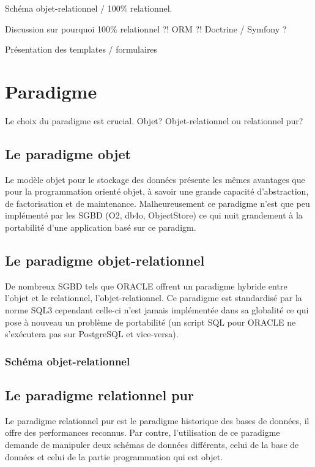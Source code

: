 Schéma objet-relationnel / 100\% relationnel.

Discussion sur pourquoi 100\% relationnel ?! ORM ?! Doctrine / Symfony ?

Présentation des templates / formulaires

\section{Paradigme}
Le choix du paradigme est crucial. Objet? Objet-relationnel ou relationnel pur?

\subsection{Le paradigme objet}

Le modèle objet pour le stockage des données présente les mêmes avantages que pour la programmation orienté objet, à savoir
une grande capacité d'abstraction, de factorisation et de maintenance. Malheureusement ce paradigme n'est que peu implémenté 
par les SGBD (O2, db4o, ObjectStore) ce qui nuit grandement à la portabilité d'une application basé sur ce paradigm.

\subsection{Le paradigme objet-relationnel}

De nombreux SGBD tels que ORACLE offrent un paradigme hybride entre l'objet et le relationnel, l'objet-relationnel.
Ce paradigme est standardisé par la norme SQL3 cependant celle-ci n'est jamais implémentée dans sa globalité
ce qui pose à nouveau un problème de portabilité (un script SQL pour ORACLE ne s'exécutera pas sur PostgreSQL et vice-versa).

\subsubsection{Schéma objet-relationnel}


\subsection{Le paradigme relationnel pur}

Le paradigme relationnel pur est le paradigme historique des bases de données, il offre des performances reconnus. Par contre,
l'utilisation de ce paradigme demande de manipuler deux schémas de données différents, celui de la base de données et celui de
la partie programmation qui est objet.


